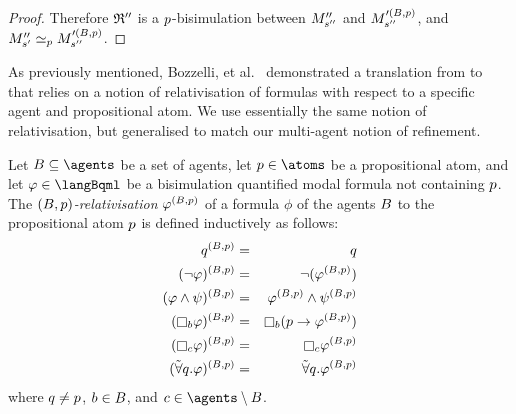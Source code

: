 \begin{proof}
Therefore $\bisimulation''$ is a $\atomP$-bisimulation between $\kPModelPP{\kStateSPP}$ and $\kPModel[\prime(\agentsB, \atomP)]{\kStateSPP}$, and $\kPModelPP{\kStateSP} \bisimilar[\atomP] \kPModel[\prime(\agentsB, \atomP)]{\kStateSPP}$.
\end{proof}

As previously mentioned, Bozzelli, et al.~\cite{bozzelli:2014b} demonstrated a translation from \langRml{} to \langBqml{} that relies on a notion of relativisation of \langBqml{} formulas with respect to a specific agent and propositional atom.
We use essentially the same notion of relativisation, but generalised to match our multi-agent notion of refinement.

\begin{definition}[Relativisation]
Let $\agentsB \subseteq \agents$ be a set of agents, let $\atomP \in \atoms$ be a propositional atom, and let $\phi \in \langBqml$ be a bisimulation quantified modal formula not containing $\atomP$.
The {\em $(\agentsB, \atomP)$-relativisation} $\phi^{(\agentsB, \atomP)}$ of a formula $\phi$ of the agents $\agentsB$ to the propositional atom $\atomP$ is defined inductively as follows:
\begin{eqnarray*}
    \atomQ^{(\agentsB, \atomP)} &=& \atomQ\\
    (\lnot \phi)^{(\agentsB, \atomP)} &=& \lnot (\phi^{(\agentsB, \atomP)})\\
    (\phi \land \psi)^{(\agentsB, \atomP)} &=& \phi^{(\agentsB, \atomP)} \land \psi^{(\agentsB, \atomP)}\\
    (\necessaryB \phi)^{(\agentsB, \atomP)} &=& \necessaryB (\atomP \implies \phi^{(\agentsB, \atomP)})\\
    (\necessaryC \phi)^{(\agentsB, \atomP)} &=& \necessaryC \phi^{(\agentsB, \atomP)}\\
    (\allbisimsQ \phi)^{(\agentsB, \atomP)} &=& \allbisimsQ \phi^{(\agentsB, \atomP)}\\
\end{eqnarray*}
where $\atomQ \neq \atomP$, $\agentB \in \agentsB$, and $\agentC \in \agents \setminus \agentsB$.
\end{definition}

